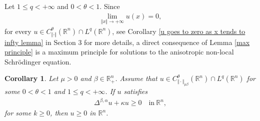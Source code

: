 \documentclass[10pt, leqno]{article}
\newtheorem{corollary}[theorem]{Corollary}
\theoremstyle{definition}
\theoremstyle{remark}
\numberwithin{equation}{section}
\begin{document}
Let $1 \leq q < + \infty$ and $0 < \theta < 1$. Since
\begin{eqnarray}
\label{u goes to zero as x tends to infty preliminaries}
\lim_{\Vert x \Vert \rightarrow +\infty } u(x) = 0,
\end{eqnarray}
for every $u \in C^{\theta}_{\Vert \cdot \Vert}\left(\mathbb{R}^{n}\right) \cap L^{q}\left(\mathbb{R}^{n}\right)$, see Corollary \ref{u goes to zero as x tends to infty lemma} in Section 3 for more details, a direct consequence of Lemma \ref{max principle} is a maximum principle for solutions to the anisotropic non-local Schr\"odinger equation.
\begin{corollary}
\label{max princ 1}
Let $\mu >0$ and $\beta \in \mathbb{R}^{n}_{+}$. Assume that $u \in C^{\theta}_{\Vert \cdot \Vert_{\mu \beta}}\left(\mathbb{R}^{n}\right) \cap L^{q}\left(\mathbb{R}^{n}\right)$ for some $0 < \theta < 1$ and $1 \leq q < +\infty$. If $u$ satisfies
\begin{eqnarray}
\Delta^{\beta, \alpha} u + \kappa u \geq 0 \quad \text{in} \ \mathbb{R}^{n},
\end{eqnarray}
for some $k \geq 0$, then $u \geq 0$ in $\mathbb{R}^{n}$.
\end{corollary}
\end{document}
